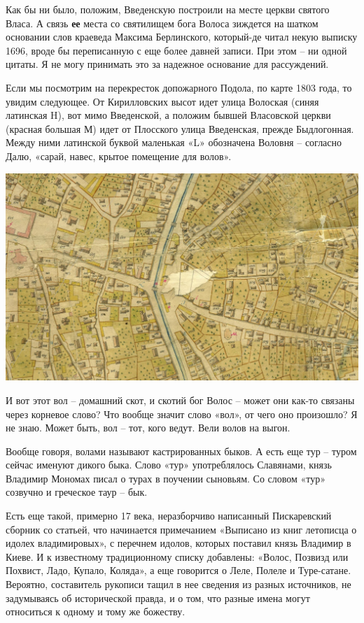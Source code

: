 Как бы ни было, положим, Введенскую построили на месте церкви святого Власа. А связь \textbf{ее} места со святилищем бога Волоса зиждется на шатком основании слов краеведа Максима Берлинского, который-де читал некую выписку 1696, вроде бы переписанную с еще более давней записи. При этом – ни одной цитаты. Я не могу принимать это за надежное основание для рассуждений.

Если мы посмотрим на перекресток допожарного Подола, по карте 1803 года, то увидим следующее. От Кирилловских высот идет улица Волоская (синяя латинская H), вот мимо Введенской, а положим бывшей Власовской церкви (красная большая М) идет от Плосского улица Введенская, прежде Быдлогонная. Между ними латинской буквой маленькая «L» обозначена Воловня – согласно Далю, «сарай, навес, крытое помещение для волов».

\begin{center}
\includegraphics[width=\linewidth]{chast-colebanie-osnov/tur/volos-map-01.jpg}
\end{center}

   И вот этот вол – домашний скот, и скотий бог Волос – может они как-то связаны через корневое слово? Что вообще значит слово «вол», от чего оно произошло? Я не знаю. Может быть, вол – тот, кого ведут. Вели волов на выгон.

   Вообще говоря, волами называют кастрированных быков. А есть еще тур – туром сейчас именуют дикого быка. Слово «тур» употреблялось Славянами, князь Владимир Мономах писал о турах в поучении сыновьям. Со словом «тур» созвучно и греческое таур – бык.

Есть еще такой, примерно 17 века, неразборчиво написанный Пискаревский сборник со статьей, что начинается примечанием «Выписано из книг летописца о идолех владимировых», с перечнем идолов, которых поставил князь Владимир в Киеве. И к известному традиционному списку добавлены: «Волос, Позвизд или Похвист, Ладо, Купало, Коляда», а еще говорится о Леле, Полеле и Туре-сатане. Вероятно, составитель рукописи тащил в нее сведения из разных источников, не задумываясь об исторической правда, и о том, что разные имена могут относиться к одному и тому же божеству. 

